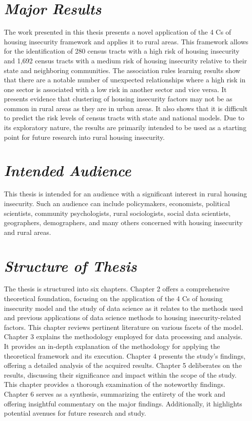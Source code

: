   
\section{\textit{Major Results}} 

The work presented in this thesis presents a novel application of the 4 Cs of housing insecurity framework and applies it to rural areas. This framework allows for the identification of 280 census tracts with a high risk of housing insecurity and 1,692 census tracts with a medium risk of housing insecurity relative to their state and neighboring communities. The association rules learning results show that there are a notable number of unexpected relationships where a high risk in one sector is associated with a low risk in another sector and vice versa. It presents evidence that clustering of housing insecurity factors may not be as common in rural areas as they are in urban areas. It also shows that it is difficult to predict the risk levels of census tracts with state and national models. Due to its exploratory nature, the results are primarily intended to be used as a starting point for future research into rural housing insecurity.  

 

\section{\textit{Intended Audience}} 

This thesis is intended for an audience with a significant interest in rural housing insecurity. Such an audience can include policymakers, economists, political scientists, community psychologists, rural sociologists, social data scientists, geographers, demographers, and many others concerned with housing insecurity and rural areas.  

 

\section{\textit{Structure of Thesis}} 

The thesis is structured into six chapters. Chapter 2 offers a comprehensive theoretical foundation, focusing on the application of the 4 Cs of housing insecurity model and the study of data science as it relates to the methods used and previous applications of data science methods to housing insecurity-related factors. This chapter reviews pertinent literature on various facets of the model. Chapter 3 explains the methodology employed for data processing and analysis. It provides an in-depth explanation of the methodology for applying the theoretical framework and its execution. Chapter 4 presents the study's findings, offering a detailed analysis of the acquired results. Chapter 5 deliberates on the results, discussing their significance and impact within the scope of the study. This chapter provides a thorough examination of the noteworthy findings. Chapter 6 serves as a synthesis, summarizing the entirety of the work and offering insightful commentary on the major findings. Additionally, it highlights potential avenues for future research and study. 

 

\endinput 

 
